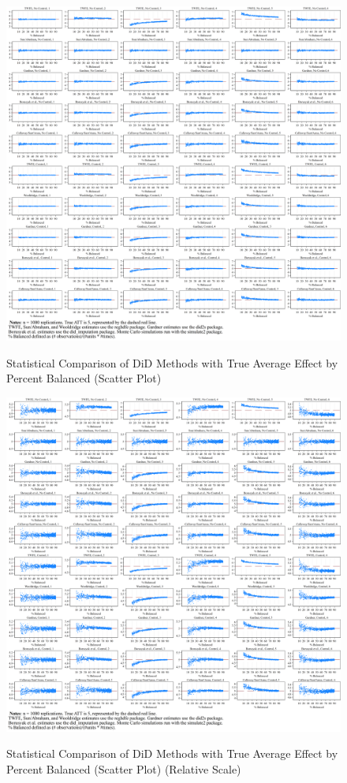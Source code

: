 \documentclass[12pt]{article}
\begin{document}
\begin{figure}
    \centering
    \caption{Statistical Comparison of DiD Methods with True Average Effect by Percent Balanced (Scatter Plot)}
    \includegraphics[width=6in]{Figures/Scatters by Percent Balanced Common Scale.png}
    \label{fig:scatters-common}
\end{figure}

\begin{figure}
    \centering
    \caption{Statistical Comparison of DiD Methods with True Average Effect by Percent Balanced (Scatter Plot) (Relative Scale)}
    \includegraphics[width=6in]{Figures/Scatters by Percent Balanced Relative Scale.png}
    \label{fig:scatters-relative}
\end{figure}
\end{document}
